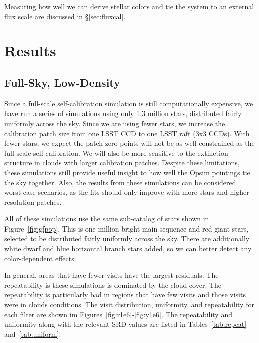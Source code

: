 \documentclass[12pt,preprint]{aastex}
\begin{document}
Measuring how well we can derive stellar colors and tie the system to an external flux scale are discussed in \S\ref{sec:fluxcal}.








\section{Results}



\subsection{Full-Sky, Low-Density}\label{sec:fsld}

Since a full-scale self-calibration simulation is still computationally expensive, we have run a series of simulations using only 1.3 million stars, distributed fairly uniformly across the sky.  Since we are using fewer stars, we increase the calibration patch size from one LSST CCD to one LSST raft (3x3 CCDs).  With fewer stars, we expect the patch zero-points will not be as well constrained as the full-scale self-calibration.  We will also be more sensitive to the extinction structure in clouds with larger calibration patches.  Despite these limitations, these simulations still provide useful insight to how well the Opsim pointings tie the sky together.  Also, the results from these simulations can be considered worst-case scenarios, as the fits should only improve with more stars and higher resolution patches.


All of these simulations use the same sub-catalog of stars shown in Figure~\ref{fig:gfpop}.  This is one-million bright main-sequence and red giant stars, selected to be distributed fairly uniformly across the sky.  There are additionally white dwarf and blue horizontal branch stars added, so we can better detect any color-dependent effects.

In general, areas that have fewer visits have the largest residuals.  The repeatability is these simulations is dominated by the cloud cover.  The repeatability is particularly bad in regions that have few visits and those visits were in clouds conditions.  The visit distribution, uniformity, and repeatability for each filter are shown im Figures~\ref{fig:r1e6}-\ref{fig:y1e6}.  The repeatability and uniformity along with the relevant SRD values are listed in Tables~\ref{tab:repeat} and~\ref{tab:uniform}.
\end{document}
